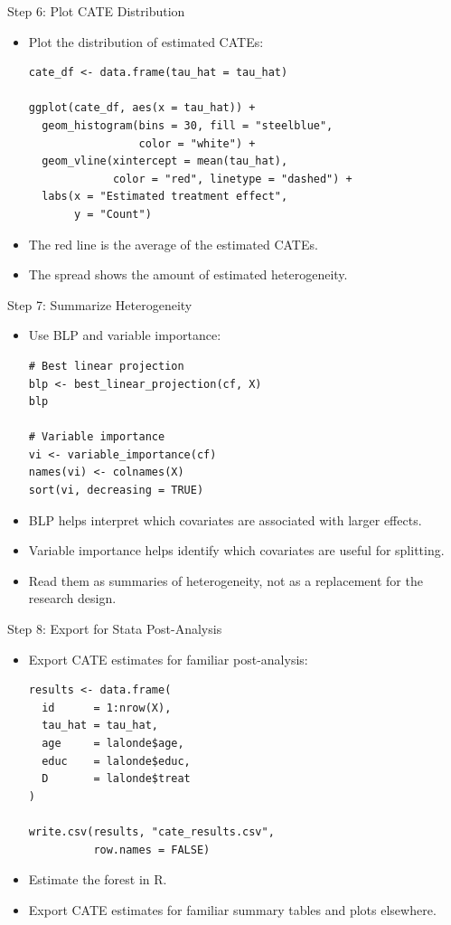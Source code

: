 \documentclass[hyperref={pdfpagelabels=false}]{beamer}
\begin{document}
\begin{frame}[fragile]{Step 6: Plot CATE Distribution}
\begin{itemize}
  \item Plot the distribution of estimated CATEs:
\begin{lstlisting}[style=r-style]
cate_df <- data.frame(tau_hat = tau_hat)

ggplot(cate_df, aes(x = tau_hat)) +
  geom_histogram(bins = 30, fill = "steelblue",
                 color = "white") +
  geom_vline(xintercept = mean(tau_hat),
             color = "red", linetype = "dashed") +
  labs(x = "Estimated treatment effect",
       y = "Count")
\end{lstlisting}
  \vspace{0.1cm}
  \item The red line is the average of the estimated CATEs.
  \item The spread shows the amount of estimated heterogeneity.
\end{itemize}
\end{frame}

\begin{frame}[fragile]{Step 7: Summarize Heterogeneity}
\begin{itemize}
  \item Use BLP and variable importance:
\begin{lstlisting}[style=r-style]
# Best linear projection
blp <- best_linear_projection(cf, X)
blp

# Variable importance
vi <- variable_importance(cf)
names(vi) <- colnames(X)
sort(vi, decreasing = TRUE)
\end{lstlisting}
  \vspace{0.1cm}
  \item BLP helps interpret which covariates are associated with larger effects.
  \item Variable importance helps identify which covariates are useful for splitting.
  \item Read them as summaries of heterogeneity, not as a replacement for the research design.
\end{itemize}
\end{frame}

\begin{frame}[fragile]{Step 8: Export for Stata Post-Analysis}
\begin{itemize}
  \item Export CATE estimates for familiar post-analysis:
\begin{lstlisting}[style=r-style]
results <- data.frame(
  id      = 1:nrow(X),
  tau_hat = tau_hat,
  age     = lalonde$age,
  educ    = lalonde$educ,
  D       = lalonde$treat
)

write.csv(results, "cate_results.csv",
          row.names = FALSE)
\end{lstlisting}
  \vspace{0.1cm}
  \item Estimate the forest in R.
  \item Export CATE estimates for familiar summary tables and plots elsewhere.
\end{itemize}
\end{frame}
\end{document}
